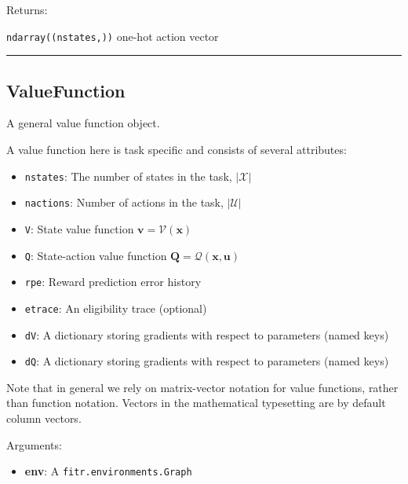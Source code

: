 Returns:

\texttt{ndarray((nstates,))} one-hot action vector

\begin{center}\rule{0.5\linewidth}{\linethickness}\end{center}

\subsection{ValueFunction}\label{valuefunction}

\begin{Shaded}
\begin{Highlighting}[]
\end{Highlighting}
\end{Shaded}

A general value function object.

A value function here is task specific and consists of several
attributes:

\begin{itemize}
\tightlist
\item
  \texttt{nstates}: The number of states in the task, \(|\mathcal X|\)
\item
  \texttt{nactions}: Number of actions in the task, \(|\mathcal U|\)
\item
  \texttt{V}: State value function \(\mathbf v = \mathcal V(\mathbf x)\)
\item
  \texttt{Q}: State-action value function
  \(\mathbf Q = \mathcal Q(\mathbf x, \mathbf u)\)
\item
  \texttt{rpe}: Reward prediction error history
\item
  \texttt{etrace}: An eligibility trace (optional)
\item
  \texttt{dV}: A dictionary storing gradients with respect to parameters
  (named keys)
\item
  \texttt{dQ}: A dictionary storing gradients with respect to parameters
  (named keys)
\end{itemize}

Note that in general we rely on matrix-vector notation for value
functions, rather than function notation. Vectors in the mathematical
typesetting are by default column vectors.

Arguments:

\begin{itemize}
\tightlist
\item
  \textbf{env}: A \texttt{fitr.environments.Graph}
\end{itemize}

